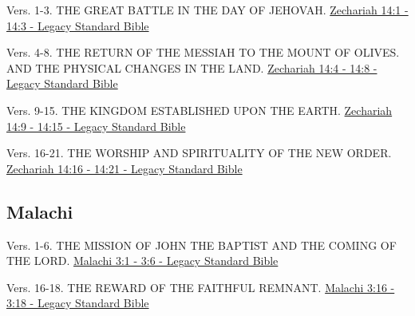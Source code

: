 \documentclass[
  ignorenonframetext,
]{beamer}
\begin{document}
\begin{frame}{14}
\label{section-147}
\begin{block}{Vers. 1-3. THE GREAT BATTLE IN THE DAY OF JEHOVAH.}
\label{vers.-1-3.-the-great-battle-in-the-day-of-jehovah.}
\href{https://read.lsbible.org/?q=zech14\%3A1-3}{Zechariah 14:1 - 14:3 -
Legacy Standard Bible}
\end{block}

\begin{block}{Vers. 4-8. THE RETURN OF THE MESSIAH TO THE MOUNT OF
OLIVES. AND THE PHYSICAL CHANGES IN THE LAND.}
\label{vers.-4-8.-the-return-of-the-messiah-to-the-mount-of-olives.-and-the-physical-changes-in-the-land.}
\href{https://read.lsbible.org/?q=zech14\%3A4-8}{Zechariah 14:4 - 14:8 -
Legacy Standard Bible}
\end{block}

\begin{block}{Vers. 9-15. THE KINGDOM ESTABLISHED UPON THE EARTH.}
\label{vers.-9-15.-the-kingdom-established-upon-the-earth.}
\href{https://read.lsbible.org/?q=zech14\%3A9-15}{Zechariah 14:9 - 14:15
- Legacy Standard Bible}
\end{block}

\begin{block}{Vers. 16-21. THE WORSHIP AND SPIRITUALITY OF THE NEW
ORDER.}
\label{vers.-16-21.-the-worship-and-spirituality-of-the-new-order.}
\href{https://read.lsbible.org/?q=zech14\%3A16-21}{Zechariah 14:16 -
14:21 - Legacy Standard Bible}
\end{block}
\end{frame}

\subsection{Malachi}\label{malachi}

\begin{frame}{3}
\label{section-148}
\begin{block}{Vers. 1-6. THE MISSION OF JOHN THE BAPTIST AND THE COMING
OF THE LORD.}
\label{vers.-1-6.-the-mission-of-john-the-baptist-and-the-coming-of-the-lord.}
\href{https://read.lsbible.org/?q=mal3\%3A1-6}{Malachi 3:1 - 3:6 -
Legacy Standard Bible}
\end{block}

\begin{block}{Vers. 16-18. THE REWARD OF THE FAITHFUL REMNANT.}
\label{vers.-16-18.-the-reward-of-the-faithful-remnant.}
\href{https://read.lsbible.org/?q=mal3\%3A16-18}{Malachi 3:16 - 3:18 -
Legacy Standard Bible}
\end{block}
\end{frame}
\end{document}
